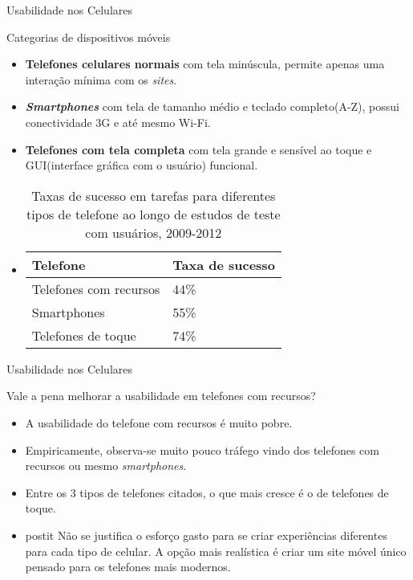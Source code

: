 \begin{frame}{Usabilidade nos Celulares}
\begin{block}{Categorias de dispositivos móveis}
  \begin{itemize}
    \item<1-> \textbf{Telefones celulares normais} com tela minúscula, permite apenas uma interação mínima com os \emph{sites}.
    \item<2-> \emph{\textbf{Smartphones}} com tela de tamanho médio e teclado completo(A-Z), possui conectividade 3G e até mesmo Wi-Fi.
    \item<3-> \textbf{Telefones com tela completa} com tela grande e sensível ao toque e GUI(interface gráfica com o usuário) funcional.

    \item<4->[]
      \begin{table}
        \centering
        \begin{tabular}{ll}
          \toprule
          \textbf{Telefone}       & \textbf{Taxa de sucesso}\\
          \midrule
          Telefones com recursos  & 44\% \\
          Smartphones             & 55\% \\
          Telefones de toque      & 74\% \\
          \bottomrule
        \end{tabular}
        \parbox{0.70\textwidth}{\caption{Taxas de sucesso em tarefas para diferentes tipos de telefone ao longo de estudos de teste com usuários, 2009-2012}}
      \end{table}
  \end{itemize}
\end{block}
\end{frame}

\begin{frame}{Usabilidade nos Celulares}
\begin{block}{Vale a pena melhorar a usabilidade em telefones com recursos?}
  \begin{itemize}
    \item<1-> A usabilidade do telefone com recursos é muito pobre.
    \item<2-> Empiricamente, observa-se muito pouco tráfego vindo dos telefones com recursos ou mesmo \emph{smartphones}.
    \item<3-> Entre os 3 tipos de telefones citados, o que mais cresce é o de telefones de toque.
    \bigskip
    \item<4->[]
    \begin{beamercolorbox}[sep=1em]{postit}
      Não se justifica o esforço gasto para se criar experiências diferentes para cada tipo de celular. A opção mais realística é criar um site móvel único pensado para os telefones mais modernos.
    \end{beamercolorbox}
  \end{itemize}
\end{block}
\end{frame}
